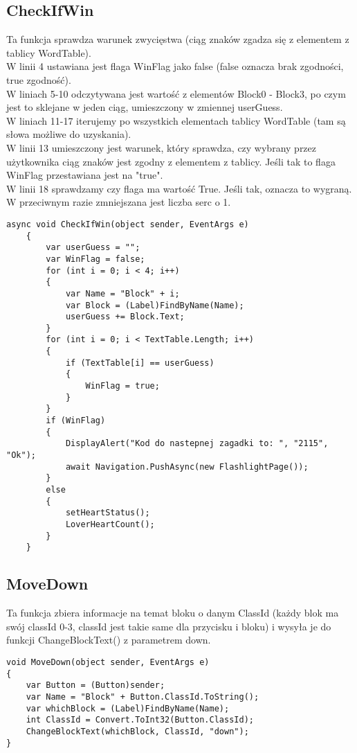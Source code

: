 \subsection{CheckIfWin}
\hspace{0.60cm}Ta funkcja sprawdza warunek zwycięstwa (ciąg znaków zgadza się z elementem z tablicy WordTable). 
\\W linii 4 ustawiana jest flaga WinFlag jako false (false oznacza brak zgodności, true zgodność). 
\\W liniach 5-10 odczytywana jest wartość z elementów Block0 - Block3, po czym jest to sklejane w jeden ciąg, umieszczony w zmiennej userGuess.
\\W liniach 11-17 iterujemy po wszystkich elementach tablicy WordTable (tam są słowa możliwe do uzyskania). 
\\W linii 13 umieszczony jest warunek, który sprawdza, czy wybrany przez użytkownika ciąg znaków jest zgodny z elementem z tablicy. Jeśli tak to flaga WinFlag przestawiana jest na "true".
\\W linii 18 sprawdzamy czy flaga ma wartość True. Jeśli tak, oznacza to wygraną. W przeciwnym razie zmniejszana jest liczba serc o 1.

\begin{lstlisting}[caption=CheckIfWin]
	 async void CheckIfWin(object sender, EventArgs e)
	{
		var userGuess = "";
		var WinFlag = false;
		for (int i = 0; i < 4; i++)
		{
			var Name = "Block" + i;
			var Block = (Label)FindByName(Name);
			userGuess += Block.Text;
		}
		for (int i = 0; i < TextTable.Length; i++)
		{
			if (TextTable[i] == userGuess)
			{
				WinFlag = true;
			}
		}
		if (WinFlag)
		{
			DisplayAlert("Kod do nastepnej zagadki to: ", "2115", "Ok");
			await Navigation.PushAsync(new FlashlightPage());
		}
		else
		{
			setHeartStatus();
			LoverHeartCount();
		}
	}
\end{lstlisting}

\subsection{MoveDown}
Ta funkcja zbiera informacje na temat bloku o danym ClassId (każdy blok ma swój classId 0-3, classId jest takie same dla przycisku i bloku) i wysyła je do funkcji ChangeBlockText() z parametrem down.
\begin{lstlisting}[caption=MoveDown]
        void MoveDown(object sender, EventArgs e)
{
	var Button = (Button)sender;
	var Name = "Block" + Button.ClassId.ToString();
	var whichBlock = (Label)FindByName(Name);
	int ClassId = Convert.ToInt32(Button.ClassId);
	ChangeBlockText(whichBlock, ClassId, "down");
}
\end{lstlisting}